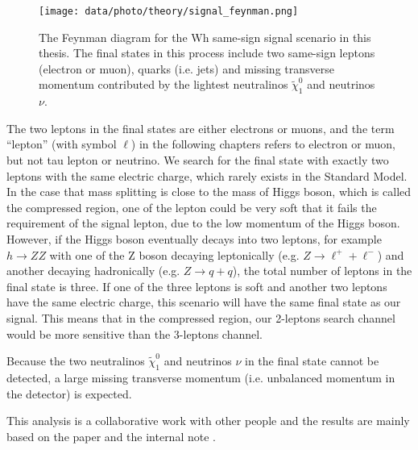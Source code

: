 \begin{figure}
\centering
\texttt{[image: data/photo/theory/signal\_feynman.png]}
\caption{The Feynman diagram for the Wh same-sign signal scenario in this thesis. The final states in this process include two same-sign leptons (electron or muon), quarks (i.e. jets) and missing transverse momentum contributed by the lightest neutralinos $\tilde{\chi}_1^0$ and neutrinos $\nu$.}
\label{fig:signal_feynman}
\end{figure}

The two leptons in the final states are either electrons or muons, and the term ``lepton'' (with symbol $\ell$) in the following chapters refers to electron or muon, but not tau lepton or neutrino.
We search for the final state with exactly two leptons with the same electric charge, which rarely exists in the Standard Model.
In the case that mass splitting is close to the mass of Higgs boson, which is called the compressed region, one of the lepton could be very soft that it fails the requirement of the signal lepton, due to the low momentum of the Higgs boson.
However, if the Higgs boson eventually decays into two leptons, for example $h \rightarrow ZZ$ with one of the Z boson decaying leptonically (e.g. $Z \rightarrow \ell^{+} + \ell^{-}$) and another decaying hadronically (e.g. $Z \rightarrow q + q$), the total number of leptons in the final state is three.
If one of the three leptons is soft and another two leptons have the same electric charge, this scenario will have the same final state as our signal.
This means that in the compressed region, our 2-leptons search channel would be more sensitive than the 3-leptons channel.

Because the two neutralinos $\tilde{\chi}_1^0$ and neutrinos $\nu$ in the final state cannot be detected, a large missing transverse momentum (i.e. unbalanced momentum in the detector) is expected.

This analysis is a collaborative work with other people and the results are mainly based on the paper \cite{Wh} and the internal note \cite{WhSS}.
